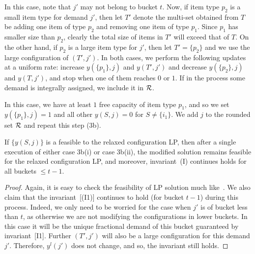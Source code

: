 \medskip {}
In this case, note that $j'$ may not belong to bucket $t$. Now, if item type $p_2$ is a small item type for demand $j'$, then let $T'$ denote the multi-set obtained from $T$ be adding one item of type $p_2$ and removing one item of type $p_1$. Since $p_1$ has smaller size than $p_2$, clearly the total size of items in $T'$ will exceed that of $T$. On the other hand, if $p_2$ is a large item type for $j'$, then let $T' = \{p_2\}$ and we use the large configuration of $(T',j')$. In both cases, we perform the following updates at a uniform rate: increase $y(\{p_1\},j)$ and $y(T',j')$ and decrease $y(\{p_2\},j)$ and $y(T,j')$, and stop when one of them reaches $0$ or $1$. If in the process some demand is integrally assigned, we include it in ${\cal R}$.

\medskip {}
In this case, we have at least $1$ free capacity of item type $p_1$, and so we set $y(\{p_1\},j)= 1$ and all other $y(S,j) = 0$ for $S \neq \{i_1\}$. We add $j$ to the rounded set ${\cal R}$ and repeat this step (3b).


\begin{claim} \label{cl:step3b}
If $\{y(S,j)\}$ is a feasible to the relaxed configuration LP, then after a single execution of either case 3b(i) or case 3b(ii), the modified solution remains feasible for the relaxed configuration LP, and moreover, invariant~(I) continues holds for all buckets $\leq t-1$.
\end{claim}
\begin{proof}
Again, it is easy to check the feasibility of LP solution much like~. We also claim that the invariant~[(I1)] continues to hold (for bucket $t-1$) during this process. Indeed, we only need to be worried for the case when $j'$ is of bucket less than $t$, as otherwise we are not modifying the configurations in lower buckets. In this case it will be the unique fractional demand of this bucket guaranteed by invariant~[I1]. Further $(T',j')$ will also be a large configuration for this demand $j'$. Therefore, $y^l(j')$ does not change, and so, the invariant still holds.
\end{proof}

